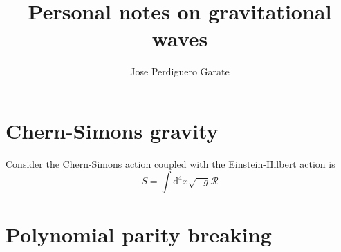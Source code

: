 \documentclass{article}
\title{Personal notes on gravitational waves}
\author{Jose Perdiguero Garate}
\begin{document}
\maketitle
\tableofcontents

\section{Chern-Simons gravity}

Consider the Chern-Simons action coupled with the Einstein-Hilbert action is
\begin{equation}
    S = \int \mathrm{d}^4x \sqrt{-g}\mathcal{R}
\end{equation}

\section{Polynomial parity breaking}





\end{document}
